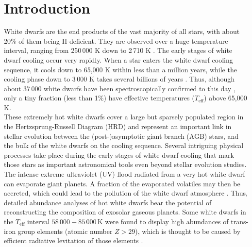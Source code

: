 \documentclass{aa}
\newcommand{\Teff}{\mbox{$T_\mathrm{eff}$}\xspace}
\begin{document}
 
\maketitle
 
%
 
\section{Introduction}
\label{sect:intro}
 
White dwarfs are the end products of the vast majority of all stars,
with about 20\% of them being H-deficient. They are observed over a huge
temperature interval, ranging from 250\,000 K \citep{WernerRauch2015}
down to 2\,710 K \citep{Gianninas+2015}. The early stages of white dwarf cooling
occur very rapidly. When a star enters the white dwarf cooling sequence,
it cools down to 65,000 K within less than a million years, while the
cooling phase down to 3\,000 K takes several billions of years
\citep{Althaus+2009, Renedo+2010}. Thus, although about 37\,000 white dwarfs
have been spectroscopically confirmed to this day \citep{Kepler+2019},
only a tiny fraction (less than 1\%) have effective temperatures (\Teff)
above 65,000\,K.\\
These extremely hot white dwarfs cover a large but sparsely populated region in the
Hertzsprung-Russell Diagram (HRD) and represent an important link in
stellar evolution between the (post-)asymptotic giant branch (AGB) stars,
and the bulk of the white dwarfs on the cooling sequence. Several intriguing
physical processes take place during the early stages of white dwarf cooling that mark those
stars as important astronomical tools even beyond stellar evolution studies.
The intense extreme ultraviolet (UV) flood radiated from a very hot white
dwarf can evaporate giant planets. A fraction of the evaporated volatiles may
then be accreted, which could lead to the pollution of the white dwarf atmosphere
\citep{Gaensicke+2019, Schreiber+2019}. Thus, detailed abundance analyses of
hot white dwarfs bear the potential of reconstructing the composition of
exosolar gaseous planets.
Some white dwarfs in the \Teff interval $58\,000-85\,000$\,K were found to
display high abundances of trans-iron group elements (atomic number $Z>29$),
which is thought to be caused by efficient radiative levitation of those
elements \citep{Chayer+2005, Hoyer+2017, Hoyer+2018, Loebling+2020}.
\end{document}
